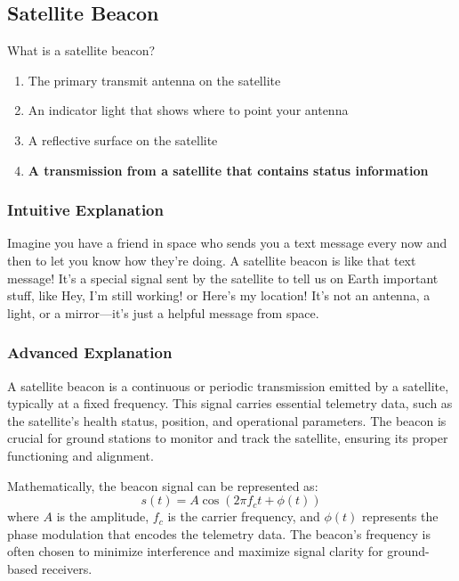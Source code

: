 \subsection{Satellite Beacon}
\label{T8B05}

\begin{tcolorbox}[colback=gray!10!white,colframe=black!75!black,title=T8B05]
What is a satellite beacon?  
\begin{enumerate}[label=\Alph*)]
    \item The primary transmit antenna on the satellite
    \item An indicator light that shows where to point your antenna
    \item A reflective surface on the satellite
    \item \textbf{A transmission from a satellite that contains status information}
\end{enumerate}
\end{tcolorbox}

\subsubsection{Intuitive Explanation}
Imagine you have a friend in space who sends you a text message every now and then to let you know how they're doing. A satellite beacon is like that text message! It’s a special signal sent by the satellite to tell us on Earth important stuff, like Hey, I’m still working! or Here’s my location! It’s not an antenna, a light, or a mirror—it’s just a helpful message from space.

\subsubsection{Advanced Explanation}
A satellite beacon is a continuous or periodic transmission emitted by a satellite, typically at a fixed frequency. This signal carries essential telemetry data, such as the satellite's health status, position, and operational parameters. The beacon is crucial for ground stations to monitor and track the satellite, ensuring its proper functioning and alignment. 

Mathematically, the beacon signal can be represented as:
\[
s(t) = A \cos(2\pi f_c t + \phi(t))
\]
where \(A\) is the amplitude, \(f_c\) is the carrier frequency, and \(\phi(t)\) represents the phase modulation that encodes the telemetry data. The beacon's frequency is often chosen to minimize interference and maximize signal clarity for ground-based receivers.

